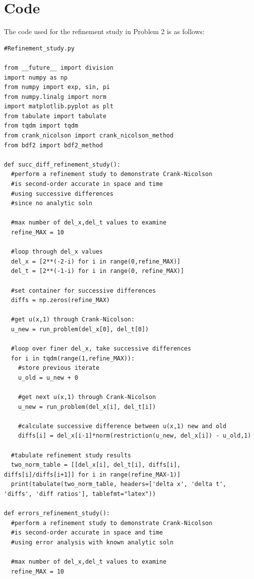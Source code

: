 \documentclass[12pt]{article}
\begin{document}
\section*{Code}
The code used for the refinement study in Problem 2 is as follows:
\begin{verbatim}
#Refinement_study.py

from __future__ import division
import numpy as np
from numpy import exp, sin, pi
from numpy.linalg import norm
import matplotlib.pyplot as plt
from tabulate import tabulate
from tqdm import tqdm
from crank_nicolson import crank_nicolson_method
from bdf2 import bdf2_method

def succ_diff_refinement_study():
  #perform a refinement study to demonstrate Crank-Nicolson
  #is second-order accurate in space and time
  #using successive differences
  #since no analytic soln

  #max number of del_x,del_t values to examine
  refine_MAX = 10

  #loop through del_x values
  del_x = [2**(-2-i) for i in range(0,refine_MAX)]
  del_t = [2**(-1-i) for i in range(0, refine_MAX)]

  #set container for successive differences
  diffs = np.zeros(refine_MAX)

  #get u(x,1) through Crank-Nicolson:
  u_new = run_problem(del_x[0], del_t[0])

  #loop over finer del_x, take successive differences
  for i in tqdm(range(1,refine_MAX)):
    #store previous iterate
    u_old = u_new + 0

    #get next u(x,1) through Crank-Nicolson
    u_new = run_problem(del_x[i], del_t[i])
    
    #calculate successive difference between u(x,1) new and old 
    diffs[i] = del_x[i-1]*norm(restriction(u_new, del_x[i]) - u_old,1)

  #tabulate refinement study results
  two_norm_table = [[del_x[i], del_t[i], diffs[i], diffs[i]/diffs[i+1]] for i in range(refine_MAX-1)] 
  print(tabulate(two_norm_table, headers=['delta x', 'delta t', 'diffs', 'diff ratios'], tablefmt="latex"))

def errors_refinement_study():
  #perform a refinement study to demonstrate Crank-Nicolson
  #is second-order accurate in space and time
  #using error analysis with known analytic soln

  #max number of del_x,del_t values to examine
  refine_MAX = 10


\end{verbatim}
\end{document}
